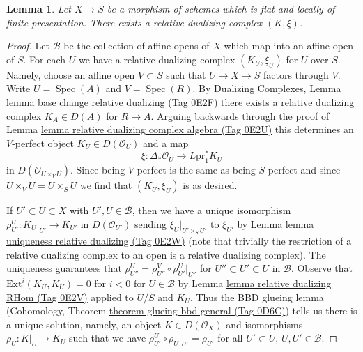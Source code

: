 \documentclass{amsart}
\theoremstyle{plain}
\newtheorem{lemma}[subsection]{Lemma}
\theoremstyle{definition}
\theoremstyle{remark}
\numberwithin{equation}{subsection}
\def\Spec{\mathop{\mathrm{Spec}}}
\begin{document}
\begin{lemma}
\label{lemma-existence-relative-dualizing}
Let $X \to S$ be a morphism of schemes which is
flat and locally of finite presentation.
There exists a relative dualizing complex $(K, \xi)$.
\end{lemma}

\begin{proof}
Let $\mathcal{B}$ be the collection of affine opens of
$X$ which map into an affine open of $S$. For each $U$
we have a relative dualizing complex $(K_U, \xi_U)$ for
$U$ over $S$. Namely, choose an affine open
$V \subset S$ such that $U \to X \to S$ factors through $V$.
Write $U = \Spec(A)$ and $V = \Spec(R)$. By
Dualizing Complexes, Lemma \href{https://stacks.math.columbia.edu/tag/0E2F}{lemma base change relative dualizing (Tag 0E2F)}
there exists a relative dualizing complex $K_A \in D(A)$
for $R \to A$. Arguing backwards through the proof of
Lemma \href{https://stacks.math.columbia.edu/tag/0E2U}{lemma relative dualizing complex algebra (Tag 0E2U)}
this determines an $V$-perfect object $K_U \in D(\mathcal{O}_U)$
and a map
$$
\xi : \Delta_*\mathcal{O}_U \to L\text{pr}_1^*K_U
$$
in $D(\mathcal{O}_{U \times_V U})$. Since being $V$-perfect is the
same as being $S$-perfect and since $U \times_V U = U \times_S U$
we find that $(K_U, \xi_U)$ is as desired.

\medskip\noindent
If $U' \subset U \subset X$ with $U', U \in \mathcal{B}$, then
we have a unique isomorphism $\rho_{U'}^U : K_U|_{U'} \to K_{U'}$
in $D(\mathcal{O}_{U'})$ sending $\xi_U|_{U' \times_S U'}$
to $\xi_{U'}$ by Lemma \href{https://stacks.math.columbia.edu/tag/0E2W}{lemma uniqueness relative dualizing (Tag 0E2W)}
(note that trivially the restriction of a relative dualizing
complex to an open is a relative dualizing complex).
The uniqueness guarantees that
$\rho^U_{U''} = \rho^V_{U''} \circ \rho ^U_{U'}|_{U''}$
for $U'' \subset U' \subset U$ in $\mathcal{B}$.
Observe that $\text{Ext}^i(K_U, K_U) = 0$ for $i < 0$
for $U \in \mathcal{B}$ by Lemma \href{https://stacks.math.columbia.edu/tag/0E2V}{lemma relative dualizing RHom (Tag 0E2V)}
applied to $U/S$ and $K_U$.
Thus the BBD glueing lemma
(Cohomology, Theorem \href{https://stacks.math.columbia.edu/tag/0D6C}{theorem glueing bbd general (Tag 0D6C)})
tells us there is a unique solution, namely, an object
$K \in D(\mathcal{O}_X)$ and isomorphisms $\rho_U : K|_U \to K_U$
such that we have
$\rho^U_{U'} \circ \rho_U|_{U'} = \rho_{U'}$ for all $U' \subset U$,
$U, U' \in \mathcal{B}$.


\end{proof}
\end{document}
